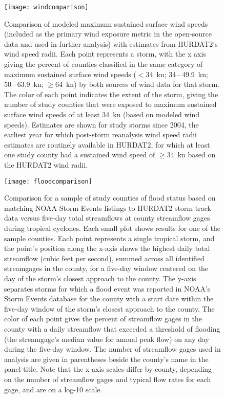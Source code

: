\begin{figure}[tbhp!]
\centering
\texttt{[image: windcomparison]}
\caption{Comparison of modeled maximum sustained surface wind speeds (included
	as the primary wind exposure metric in the open-source data and used in
	further analysis) with estimates from \ac{HURDAT2}'s wind speed radii.
	Each point represents a storm, with the x axis giving the percent of
	counties classified in the same category of maximum sustained surface
	wind speeds ($<$34~\si{\knot}; 34\,--\,49.9~\si{\knot};
	50\,--\,63.9~\si{\knot}; $\ge$64~\si{\knot}) by both sources of wind
	data for that storm. The color of each point indicates the extent of
	the storm, giving the number of study counties that were exposed to
	maximum sustained surface wind speeds of at least 34~\si{\knot} (based
	on modeled wind speeds). Estimates are shown for study storms since
	2004, the earliest year for which post-storm reanalysis wind speed
	radii estimates are routinely available in \ac{HURDAT2}, for which at
	least one study county had a sustained wind speed of $\ge$34~\si{\knot}
	based on the \ac{HURDAT2} wind radii.
	}
\label{fig:windcomparison}
\end{figure}

\begin{figure}[tbhp!]
\centering
\texttt{[image: floodcomparison]}
\caption{Comparison for a sample of study counties of flood status based on
	matching NOAA Storm Events listings to \ac{HURDAT2} storm track data
	versus five-day total streamflows at county streamflow gages during
	tropical cyclones. Each small plot shows results for one of the sample
	counties. Each point represents a single tropical storm, and the
	point's position along the x-axis shows the highest daily total
	streamflow (cubic feet per second), summed across all identified
	streamgages in the county, for a five-day window centered on the day of
	the storm's closest approach to the county. The y-axis separates storms
	for which a flood event was reported in NOAA's Storm Events database
	for the county with a start date within the five-day window of the
	storm's closest approach to the county. The color of each point gives
	the percent of streamflow gages in the county with a daily streamflow
	that exceeded a threshold of flooding (the streamgage's median value
	for annual peak flow) on any day during the five-day window. The number
	of streamflow gages used in analysis are given in parentheses beside
	the county's name in the panel title.  Note that the x-axis scales
	differ by county, depending on the number of streamflow gages and
	typical flow rates for each gage, and are on a log-10 scale.
	}
\label{fig:floodcomparison}
\end{figure}


